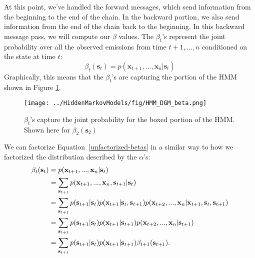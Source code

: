 
At this point, we've handled the forward messages, which send information from the beginning to the end of the chain. In the backward portion, we also send information from the end of the chain back to the beginning. In this backward message pass, we will compute our $\beta$ values.
%
The $\beta_t$'s represent the joint probability over all the observed emissions from time $t+1, ..., n$ conditioned on the state at time $t$:
\begin{equation} \label{unfactorized-betas}
	\beta_t(\textbf{s}_t) = p(\textbf{x}_{t+1}, ..., \textbf{x}_n | \textbf{s}_t)
\end{equation}
Graphically, this means that the $\beta_t$'s are capturing the portion of the HMM shown in Figure \ref{fig:HMM-DGM-beta}.
%
\begin{figure}[b!]
    \centering
    \texttt{[image: ../HiddenMarkovModels/fig/HMM\_DGM\_beta.png]}
    \caption{$\beta_t$'s capture the joint probability for the boxed portion of the HMM. Shown here for $\beta_2(\mathbf{s}_2)$} 
    \label{fig:HMM-DGM-beta}
\end{figure}



We can factorize Equation~\ref{unfactorized-betas} in a similar way to how we factorized the distribution described by the $\alpha$'s:
%
\begin{align}
  \beta_t(\textbf{s}_t) &= p(\textbf{x}_{t+1}, ..., \textbf{x}_n | \textbf{s}_t) \notag \\
&=\sum_{\textbf{s}_{t+1}} p(\textbf{x}_{t+1}, ..., \textbf{x}_n, \textbf{s}_{t+1} | \textbf{s}_t) 
 \label{eq:dcp1hmm} \\
                        &= \sum_{\textbf{s}_{t+1}} p(\textbf{s}_{t+1} | \textbf{s}_t) p(\textbf{x}_{t+1} | \textbf{s}_t, \textbf{s}_{t+1}) p(\textbf{x}_{t+2}, ..., \textbf{x}_n | \textbf{x}_{t+1}, \textbf{s}_t,\textbf{s}_{t+1}) \label{eq:dcp2hmm} \\
&  = \sum_{\textbf{s}_{t+1}} p(\textbf{s}_{t+1} | \textbf{s}_t) p(\textbf{x}_{t+1} | \textbf{s}_{t+1})
p(\textbf{x}_{t+2}, ..., \textbf{x}_n | \textbf{s}_{t+1})
  \label{eq:dcp3hmm}\\
	&= \sum_{\textbf{s}_{t+1}} p(\textbf{s}_{t+1} | \textbf{s}_t) p(\textbf{x}_{t+1} | \textbf{s}_{t+1}) \beta_{t+1}(\textbf{s}_{t+1}). \label{eq:dcp4hmm}
\end{align}


